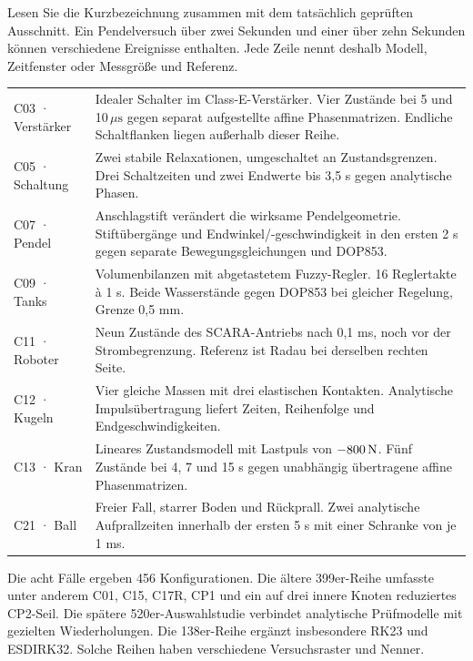 Lesen Sie die Kurzbezeichnung zusammen mit dem tatsächlich geprüften Ausschnitt. Ein Pendelversuch über zwei Sekunden und einer über zehn Sekunden können verschiedene Ereignisse enthalten. Jede Zeile nennt deshalb Modell, Zeitfenster oder Messgröße und Referenz.
{\tblstart\begin{tabularx}{\linewidth}{@{}P{22mm}Y@{}}\toprule
{}&\\\midrule
C03 · Verstärker&Idealer Schalter im Class-E-Verstärker. Vier Zustände bei 5 und 10\,\(\mu\mathrm s\) gegen separat aufgestellte affine Phasenmatrizen. Endliche Schaltflanken liegen außerhalb dieser Reihe.\\
C05 · Schaltung&Zwei stabile Relaxationen, umgeschaltet an Zustandsgrenzen. Drei Schaltzeiten und zwei Endwerte bis 3,5 s gegen analytische Phasen.\\
C07 · Pendel&Anschlagstift verändert die wirksame Pendelgeometrie. Stiftübergänge und Endwinkel/-geschwindigkeit in den ersten 2 s gegen separate Bewegungsgleichungen und DOP853.\\
C09 · Tanks&Volumenbilanzen mit abgetastetem Fuzzy-Regler. 16 Reglertakte à 1 s. Beide Wasserstände gegen DOP853 bei gleicher Regelung, Grenze 0,5 mm.\\
C11 · Roboter&Neun Zustände des SCARA-Antriebs nach 0,1 ms, noch vor der Strombegrenzung. Referenz ist Radau bei derselben rechten Seite.\\
C12 · Kugeln&Vier gleiche Massen mit drei elastischen Kontakten. Analytische Impulsübertragung liefert Zeiten, Reihenfolge und Endgeschwindigkeiten.\\
C13 · Kran&Lineares Zustandsmodell mit Lastpuls von \(-800\,\mathrm{N}\). Fünf Zustände bei 4, 7 und 15 s gegen unabhängig übertragene affine Phasenmatrizen.\\
C21 · Ball&Freier Fall, starrer Boden und Rückprall. Zwei analytische Aufprallzeiten innerhalb der ersten 5 s mit einer Schranke von je 1 ms.\\\bottomrule
\end{tabularx}\par}
Die acht Fälle ergeben 456 Konfigurationen. Die ältere 399er-Reihe umfasste unter anderem C01, C15, C17R, CP1 und ein auf drei innere Knoten reduziertes CP2-Seil. Die spätere 520er-Auswahlstudie verbindet analytische Prüfmodelle mit gezielten Wiederholungen. Die 138er-Reihe ergänzt insbesondere RK23 und ESDIRK32. Solche Reihen haben verschiedene Versuchsraster und Nenner.

